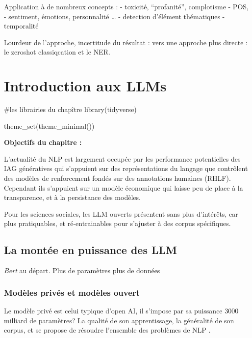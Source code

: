\documentclass[
  letterpaper,
  DIV=11,
  numbers=noendperiod]{scrreprt}
\newenvironment{Shaded}{\begin{snugshade}}{\end{snugshade}}
\newcommand{\CommentTok}[1]{\textcolor[rgb]{0.37,0.37,0.37}{#1}}
\newcommand{\FunctionTok}[1]{\textcolor[rgb]{0.28,0.35,0.67}{#1}}
\newcommand{\NormalTok}[1]{\textcolor[rgb]{0.00,0.23,0.31}{#1}}
\begin{document}
Application à de nombreux concepts : - toxicité, ``profanité'',
complotisme - POS, - sentiment, émotions, personnalité \ldots{} -
detection d'élément thématiques - temporalité

Lourdeur de l'approche, incertitude du résultat : vers une approche plus
directe : le zeroshot classiqcation et le NER.


\chapter{Introduction aux LLMs}\label{introduction-aux-llms}

\begin{Shaded}
\begin{Highlighting}[]
\CommentTok{\#les librairies du chapître}
\FunctionTok{library}\NormalTok{(tidyverse)}

\FunctionTok{theme\_set}\NormalTok{(}\FunctionTok{theme\_minimal}\NormalTok{()) }
\end{Highlighting}
\end{Shaded}

\textbf{Objectifs du chapitre :}

L'actualité du NLP est largement occupée par les performance
potentielles des IAG génératives qui s'appuient sur des représentations
du langage que contrôlent des modèles de renforcement fondés sur des
annotations humaines (RHLF). Cependant ils s'appuient sur un modèle
économique qui laisse peu de place à la transparence, et à la
persistance des modèles.

Pour les sciences sociales, les LLM ouverts présentent sans plus
d'intérêts, car plus pratiquables, et ré-entrainables pour s'ajuster à
des corpus spécifiques.

\section{La montée en puissance des
LLM}\label{la-montuxe9e-en-puissance-des-llm}

\emph{Bert} au départ. Plus de paramètres plus de données

\subsection{Modèles privés et modèles
ouvert}\label{moduxe8les-privuxe9s-et-moduxe8les-ouvert}

Le modèle privé est celui typique d'open AI, il s'impose par sa
puissance 3000 milliard de paramètres? La qualité de son apprentissage,
la généralité de son corpus, et se propose de résoudre l'ensemble des
problèmes de NLP .
\end{document}
